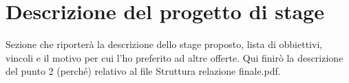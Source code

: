 \section{Descrizione del progetto di stage}

Sezione che riporterà la descrizione dello stage proposto, lista di obbiettivi, vincoli e il motivo per cui l'ho preferito ad altre offerte.
Qui finirò la descrizione del punto 2 (perché) relativo al file Struttura relazione finale.pdf.
